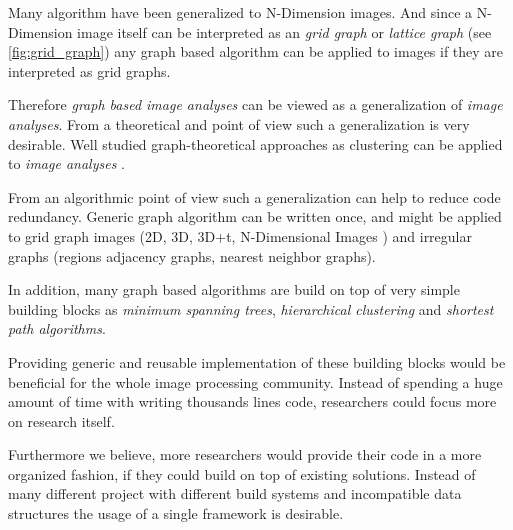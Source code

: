 
Many algorithm have been generalized to N-Dimension images.
And since a N-Dimension image itself can be interpreted as an \emph{grid graph} or \emph{lattice graph} (see \cref{fig:grid_graph}) any graph based algorithm can be applied to images if they are interpreted as grid graphs.

Therefore \emph{graph based image analyses} can be viewed as a generalization of \emph{image analyses}.
From a theoretical and  point of view such a generalization is very desirable.
Well studied graph-theoretical approaches as clustering can be applied 
to  \emph{image analyses} \cite{vlachos_1993_csv,arbelaez_2006_cvpr,ohlander_1978_cgip}.

From an algorithmic point of view such a generalization can help to reduce 
code redundancy.
Generic graph algorithm can be written once, and might be applied 
to grid graph images (2D, 3D, 3D+t, N-Dimensional Images ) and irregular graphs (regions adjacency graphs, nearest neighbor graphs).

In addition, many graph based algorithms are build on top of
very simple building blocks 
as \emph{minimum spanning trees}, \emph{hierarchical clustering} and 
\emph{shortest path algorithms}. 

Providing generic and reusable implementation of these building blocks
would be beneficial for the whole image processing community.
Instead of spending a huge amount of time with writing thousands lines code,
researchers could focus more on research itself.

Furthermore we believe, more researchers would provide their code in a more organized fashion, if 
they could build on top of existing solutions.
Instead of many different project with different build systems and incompatible data structures
the usage of a single framework is desirable.








